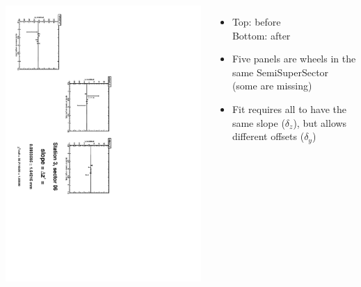 \documentclass[compress]{beamer}
\begin{document}
\begin{frame}
\begin{columns}
\vfill
\includegraphics[height=\linewidth, angle=90]{zfits_after/zfit_3_06.pdf}
\begin{itemize}
\item Top: before \\ Bottom: after
\item Five panels are wheels in the same SemiSuperSector (some are missing)
\item Fit requires all to have the same slope ($\delta_z$), but allows different offsets ($\delta_y$)
\end{itemize}
\end{columns}
\end{frame}
\end{document}
